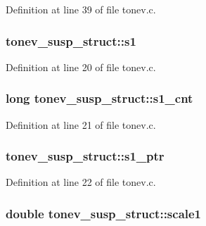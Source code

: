 Definition at line 39 of file tonev.\+c.

\subsubsection[{\texorpdfstring{s1}{s1}}]{ tonev\+\_\+susp\+\_\+struct\+::s1}\hypertarget{structtonev__susp__struct_a1a8fd08dec5a86cbaf62060825ffbc9a}{}\label{structtonev__susp__struct_a1a8fd08dec5a86cbaf62060825ffbc9a}


Definition at line 20 of file tonev.\+c.

\subsubsection[{\texorpdfstring{s1\+\_\+cnt}{s1_cnt}}]{\setlength{\rightskip}{0pt plus 5cm}long tonev\+\_\+susp\+\_\+struct\+::s1\+\_\+cnt}\hypertarget{structtonev__susp__struct_a942ea708be20077cf3a5aea768f7706b}{}\label{structtonev__susp__struct_a942ea708be20077cf3a5aea768f7706b}


Definition at line 21 of file tonev.\+c.

\subsubsection[{\texorpdfstring{s1\+\_\+ptr}{s1_ptr}}]{ tonev\+\_\+susp\+\_\+struct\+::s1\+\_\+ptr}\hypertarget{structtonev__susp__struct_a234976574d94f51206ec30e23afeaa10}{}\label{structtonev__susp__struct_a234976574d94f51206ec30e23afeaa10}


Definition at line 22 of file tonev.\+c.

\subsubsection[{\texorpdfstring{scale1}{scale1}}]{\setlength{\rightskip}{0pt plus 5cm}double tonev\+\_\+susp\+\_\+struct\+::scale1}\hypertarget{structtonev__susp__struct_adfedfdbcd42446fe6c17d49752bac7ff}{}\label{structtonev__susp__struct_adfedfdbcd42446fe6c17d49752bac7ff}


